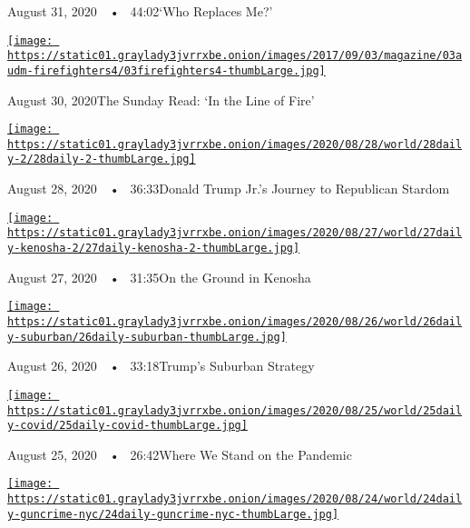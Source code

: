 August 31, 2020~~•~ 44:02`Who Replaces Me?'

\href{https://www.nytimes3xbfgragh.onion/2020/08/30/podcasts/the-daily/california-wildfires-prisoners.html?action=click\&module=audio-series-bar\&region=header\&pgtype=Article}{\texttt{[image: https://static01.graylady3jvrrxbe.onion/images/2017/09/03/magazine/03audm-firefighters4/03firefighters4-thumbLarge.jpg]}}

August 30, 2020The Sunday Read: `In the Line of Fire'

\href{https://www.nytimes3xbfgragh.onion/2020/08/28/podcasts/the-daily/donald-trump-junior-campaign.html?action=click\&module=audio-series-bar\&region=header\&pgtype=Article}{\texttt{[image: https://static01.graylady3jvrrxbe.onion/images/2020/08/28/world/28daily-2/28daily-2-thumbLarge.jpg]}}

August 28, 2020~~•~ 36:33Donald Trump Jr.'s Journey to Republican
Stardom

\href{https://www.nytimes3xbfgragh.onion/2020/08/27/podcasts/the-daily/kenosha-wisconsin-protests.html?action=click\&module=audio-series-bar\&region=header\&pgtype=Article}{\texttt{[image: https://static01.graylady3jvrrxbe.onion/images/2020/08/27/world/27daily-kenosha-2/27daily-kenosha-2-thumbLarge.jpg]}}

August 27, 2020~~•~ 31:35On the Ground in Kenosha

\href{https://www.nytimes3xbfgragh.onion/2020/08/26/podcasts/the-daily/republican-convention-suburbs.html?action=click\&module=audio-series-bar\&region=header\&pgtype=Article}{\texttt{[image: https://static01.graylady3jvrrxbe.onion/images/2020/08/26/world/26daily-suburban/26daily-suburban-thumbLarge.jpg]}}

August 26, 2020~~•~ 33:18Trump's Suburban Strategy

\href{https://www.nytimes3xbfgragh.onion/2020/08/25/podcasts/the-daily/coronavirus-plasma-reinfection.html?action=click\&module=audio-series-bar\&region=header\&pgtype=Article}{\texttt{[image: https://static01.graylady3jvrrxbe.onion/images/2020/08/25/world/25daily-covid/25daily-covid-thumbLarge.jpg]}}

August 25, 2020~~•~ 26:42Where We Stand on the Pandemic

\href{https://www.nytimes3xbfgragh.onion/2020/08/24/podcasts/the-daily/gun-violence-new-york.html?action=click\&module=audio-series-bar\&region=header\&pgtype=Article}{\texttt{[image: https://static01.graylady3jvrrxbe.onion/images/2020/08/24/world/24daily-guncrime-nyc/24daily-guncrime-nyc-thumbLarge.jpg]}}

